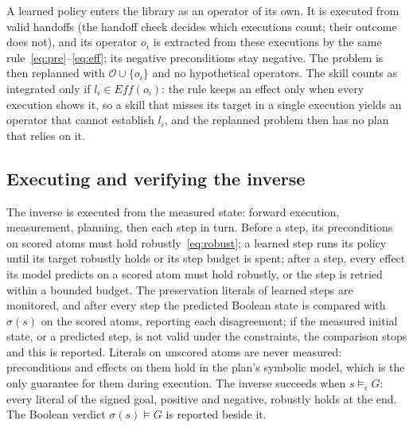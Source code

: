 A learned policy enters the library as an operator of its own. It is executed from
valid handoffs (the handoff check decides which executions count; their outcome does
not), and its operator $o_i$ is extracted from these executions by the same
rule~\eqref{eq:pre}--\eqref{eq:eff}; its negative preconditions stay negative. The
problem is then replanned with $\mathcal{O}\cup\{o_i\}$ and no hypothetical operators.
The skill counts as integrated only if $l_i\in\mathit{Eff}(o_i)$: the rule keeps an
effect only when every execution shows it, so a skill that misses its target in a
single execution yields an operator that cannot establish $l_i$, and the replanned
problem then has no plan that relies on it.

\subsection{Executing and verifying the inverse}
\label{sec:execution}

The inverse is executed from the measured state: forward execution, measurement,
planning, then each step in turn. Before a step, its preconditions on scored atoms must
hold robustly~\eqref{eq:robust}; a learned step runs its policy until its target robustly
holds or its step budget is spent; after a step, every effect its model predicts on a
scored atom must hold robustly, or the step is retried within a bounded budget. The
preservation literals of learned steps are monitored, and after every step the predicted
Boolean state is compared with $\sigma(s)$ on the scored atoms, reporting each
disagreement; if the measured initial state, or a predicted step, is not valid under the
constraints, the comparison stops and this is reported. Literals on unscored atoms are
never measured: preconditions and effects on them hold in the plan's symbolic model, which
is the only guarantee for them during execution. The inverse succeeds when
$s\models_\epsilon G$: every literal of the signed goal, positive and negative, robustly
holds at the end. The Boolean verdict $\sigma(s)\models G$ is reported beside it.

